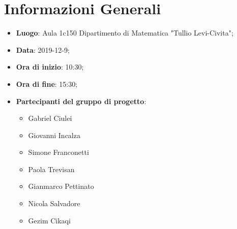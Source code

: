 \section{Informazioni Generali}
	\begin{itemize}
		\item \textbf {Luogo}: Aula 1c150 Dipartimento di Matematica "Tullio Levi-Civita";
		\item \textbf {Data}: 2019-12-9;
		\item \textbf {Ora di inizio}: 10:30;
		\item \textbf {Ora di fine}: 15:30;
		\item \textbf {Partecipanti del gruppo di progetto}:
			\begin{itemize}
				\item Gabriel Ciulei
				\item Giovanni Incalza
				\item Simone Franconetti
				\item Paola Trevisan
				\item Gianmarco Pettinato
				\item Nicola Salvadore
				\item Gezim Cikaqi
			\end{itemize}
	\end{itemize}
